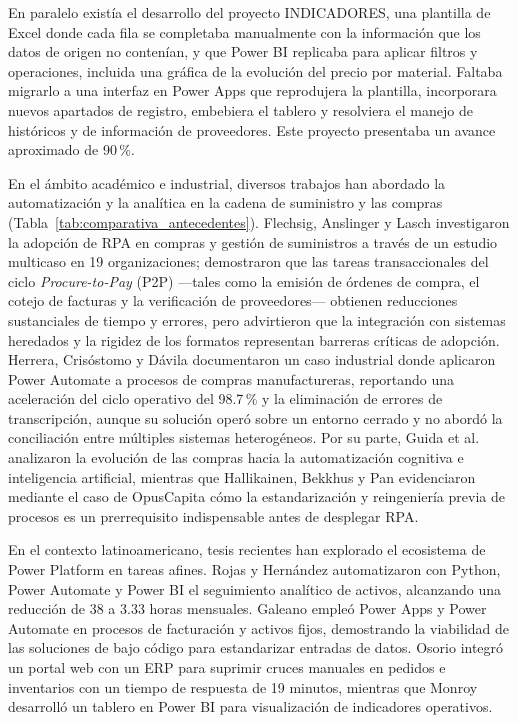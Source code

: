 En paralelo existía el desarrollo del proyecto INDICADORES, una plantilla de Excel donde cada fila se completaba manualmente con la información que los datos de origen no contenían, y que Power BI replicaba para aplicar filtros y operaciones, incluida una gráfica de la evolución del precio por material. Faltaba migrarlo a una interfaz en Power Apps que reprodujera la plantilla, incorporara nuevos apartados de registro, embebiera el tablero y resolviera el manejo de históricos y de información de proveedores. Este proyecto presentaba un avance aproximado de 90\,\%.

En el ámbito académico e industrial, diversos trabajos han abordado la automatización y la analítica en la cadena de suministro y las compras (Tabla~\ref{tab:comparativa_antecedentes}). Flechsig, Anslinger y Lasch \cite{flechsig2022rpa} investigaron la adopción de RPA en compras y gestión de suministros a través de un estudio multicaso en 19 organizaciones; demostraron que las tareas transaccionales del ciclo \emph{Procure-to-Pay} (P2P) —tales como la emisión de órdenes de compra, el cotejo de facturas y la verificación de proveedores— obtienen reducciones sustanciales de tiempo y errores, pero advirtieron que la integración con sistemas heredados y la rigidez de los formatos representan barreras críticas de adopción. Herrera, Crisóstomo y Dávila \cite{herrera2025rpa} documentaron un caso industrial donde aplicaron Power Automate a procesos de compras manufactureras, reportando una aceleración del ciclo operativo del 98.7\,\% y la eliminación de errores de transcripción, aunque su solución operó sobre un entorno cerrado y no abordó la conciliación entre múltiples sistemas heterogéneos. Por su parte, Guida et al. \cite{guida2023ai} analizaron la evolución de las compras hacia la automatización cognitiva e inteligencia artificial, mientras que Hallikainen, Bekkhus y Pan \cite{hallikainen2018rpa} evidenciaron mediante el caso de OpusCapita cómo la estandarización y reingeniería previa de procesos es un prerrequisito indispensable antes de desplegar RPA.

En el contexto latinoamericano, tesis recientes han explorado el ecosistema de Power Platform en tareas afines. Rojas y Hernández \cite{rojas2025mejora} automatizaron con Python, Power Automate y Power BI el seguimiento analítico de activos, alcanzando una reducción de 38 a 3.33 horas mensuales. Galeano \cite{galeano2025automatizacion} empleó Power Apps y Power Automate en procesos de facturación y activos fijos, demostrando la viabilidad de las soluciones de bajo código para estandarizar entradas de datos. Osorio \cite{osorio2026interoperable} integró un portal web con un ERP para suprimir cruces manuales en pedidos e inventarios con un tiempo de respuesta de 19 minutos, mientras que Monroy \cite{monroy2026tablero} desarrolló un tablero en Power BI para visualización de indicadores operativos. 

